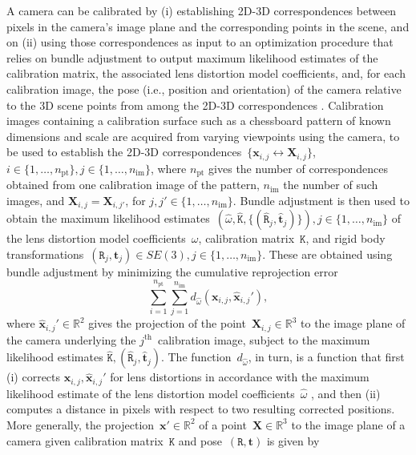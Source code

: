 \documentclass[review]{elsarticle}
\begin{document}
A camera can be calibrated by (i) establishing 2D-3D correspondences between pixels in the camera's image plane and the corresponding points in the scene, and on (ii) using those correspondences as input to an optimization procedure that relies on bundle adjustment \cite{triggs1999bundle} to output maximum likelihood estimates of the calibration matrix, the associated lens distortion model coefficients, and, for each calibration image, the pose (i.e., position and orientation) of the camera relative to the 3D scene points from among the 2D-3D correspondences \cite{Hartley2004,zhang2000flexible}. Calibration images containing a calibration surface such as a chessboard pattern of known dimensions and scale are acquired from varying viewpoints using the camera, to be used to establish the 2D-3D correspondences~$\{\mathbf{x}_{i,j} \leftrightarrow \mathbf{X}_{i,j}\}$, $i \in \{ 1, \dots, n_\text{pt} \}, j \in \{ 1, \dots, n_\text{im} \}$, where $n_\text{pt}$ gives the number of correspondences obtained from one calibration image of the pattern, $n_\text{im}$ the number of such images, and $\mathbf{X}_{i,j} = \mathbf{X}_{i,j'}$, for $j, j' \in \{ 1, \dots, n_\text{im} \}$. Bundle adjustment is then used to obtain the maximum likelihood estimates~$(\hat{\omega}, \hat{\mathtt{K}}, \{(\hat{\mathtt{R}}_j, \hat{\mathbf{t}}_j)\}), j \in \{ 1, \dots, n_\text{im} \}$ of the lens distortion model coefficients~$\omega$, calibration matrix~$\mathtt{K}$, and rigid body transformations~$(\mathtt{R}_j, \mathbf{t}_j) \in SE(3), j \in \{ 1, \dots, n_\text{im} \}$. These are obtained using bundle adjustment by minimizing the cumulative reprojection error
\begin{equation}
\sum_{i=1}^{n_\text{pt}} \sum_{j=1}^{n_\text{im}} d_{\hat{\omega}}(\mathbf{x}_{i,j}, \hat{\mathbf{x}}_{i,j}'),
\label{re}
\end{equation}
where $\hat{\mathbf{x}}_{i,j}' \in \mathbb{R}^2$ gives the projection of the point~$\mathbf{X}_{i,j} \in \mathbb{R}^3$ to the image plane of the camera underlying the $j^{\text{th}}$~calibration image, subject to the maximum likelihood estimates $\hat{\mathtt{K}}, (\hat{\mathtt{R}}_j, \hat{\mathbf{t}}_j)$. The function~$d_{\hat{\omega}}$, in turn, is a function that first (i) corrects $\mathbf{x}_{i,j}, \hat{\mathbf{x}}_{i,j}'$ for lens distortions in accordance with the maximum likelihood estimate of the lens distortion model coefficients~$\hat{\omega}$ \cite{duane1971close,weng1992camera}, and then (ii) computes a distance in pixels with respect to two resulting corrected positions. More generally, the projection~$\mathbf{x}' \in \mathbb{R}^2$ of a point~$\mathbf{X} \in \mathbb{R}^3$ to the image plane of a camera given calibration matrix~$\mathtt{K}$ and pose~$(\mathtt{R}, \mathbf{t})$ is given by
\end{document}
